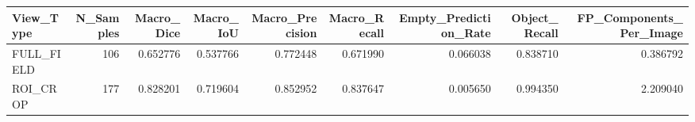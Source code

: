 \begin{tabular}{lrrrrrrrr}
\toprule
View_Type & N_Samples & Macro_Dice & Macro_IoU & Macro_Precision & Macro_Recall & Empty_Prediction_Rate & Object_Recall & FP_Components_Per_Image \\
\midrule
FULL_FIELD & 106 & 0.652776 & 0.537766 & 0.772448 & 0.671990 & 0.066038 & 0.838710 & 0.386792 \\
ROI_CROP & 177 & 0.828201 & 0.719604 & 0.852952 & 0.837647 & 0.005650 & 0.994350 & 2.209040 \\
\bottomrule
\end{tabular}
